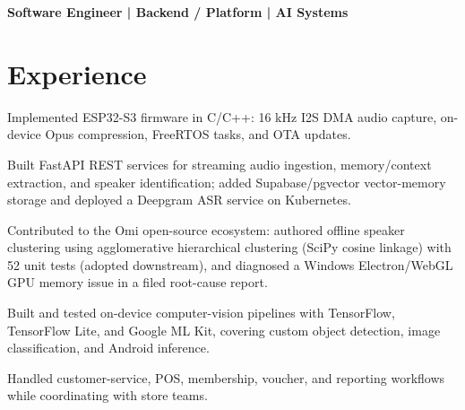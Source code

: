 \documentclass{../../../templates/1/resume}
\begin{document}

{\small\bfseries Software Engineer | Backend / Platform | AI Systems}\par\vspace{2pt}

\section{Experience}

\begin{resumeitemize}
\item Implemented ESP32-S3 firmware in C/C++: 16 kHz I2S DMA audio capture, on-device Opus compression, FreeRTOS tasks, and OTA updates.
\item Built FastAPI REST services for streaming audio ingestion, memory/context extraction, and speaker identification; added Supabase/pgvector vector-memory storage and deployed a Deepgram ASR service on Kubernetes.
\item Contributed to the Omi open-source ecosystem: authored offline speaker clustering using agglomerative hierarchical clustering (SciPy cosine linkage) with 52 unit tests (adopted downstream), and diagnosed a Windows Electron/WebGL GPU memory issue in a filed root-cause report.
\end{resumeitemize}

\begin{resumeitemize}
\item Built and tested on-device computer-vision pipelines with TensorFlow, TensorFlow Lite, and Google ML Kit, covering custom object detection, image classification, and Android inference.
\end{resumeitemize}

\begin{resumeitemize}
\item Handled customer-service, POS, membership, voucher, and reporting workflows while coordinating with store teams.
\end{resumeitemize}
\end{document}
